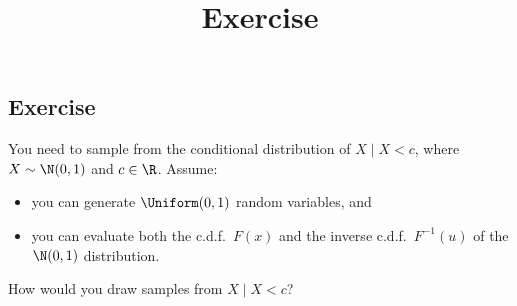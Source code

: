 \documentclass[12pt]{article}
\title{Exercise}
\author{}
\date{}
\begin{document}
\maketitle


\subsection*{Exercise}
You need to sample from the conditional distribution of $X\mid X<c$, where $X\sim\N(0,1)$ and $c\in \R$. Assume:
\begin{itemize}
    \item you can generate $\Uniform(0,1)$ random variables, and 
    \item you can evaluate both the c.d.f.\ $F(x)$ and the inverse c.d.f.\ $F^{-1}(u)$ of the $\N(0,1)$ distribution.
\end{itemize}
How would you draw samples from $X\mid X<c$?
\end{document}
